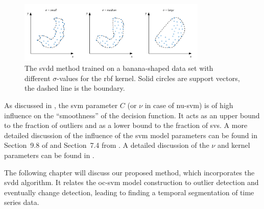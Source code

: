 \begin{figure}
  \centering
    \includegraphics[width=0.8\textwidth,keepaspectratio]{./Figures/chapter3/svdd-parameter-sigma.pdf}
  \caption[SVDD boundary with sigma parameter]{The \gls{svdd} method trained on a banana-shaped data set with different $\sigma$-values for the \gls{rbf} kernel. Solid circles are support vectors, the dashed line is the boundary.}
  \label{fig:svdd-boundary-sigma}
\end{figure}

As discussed in , the \gls{svm} parameter $C$ (or $\nu$ in case of \gls{nu-svm}) is of high influence on the ``smoothness'' of the decision function.
It acts as an upper bound to the fraction of outliers and as a lower bound to the fraction of \glspl{sv}.
A more detailed discussion of the influence of the \gls{svm} model parameters can be found in Section~9.8 of \cite{cherkassky2007learning} and Section~7.4 from \cite{flach2012machine}.
A detailed discussion of the $\nu$ and kernel parameters can be found in \cite{scholkopf2002learning}.

The following chapter will discuss our proposed method, which incorporates the \gls{svdd} algorithm.
It relates the \gls{oc-svm} model construction to outlier detection and eventually change detection, leading to finding a temporal segmentation of time series data.







